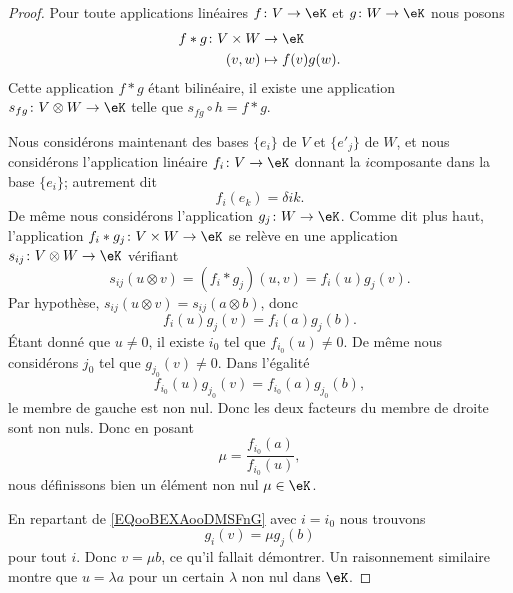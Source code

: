 \begin{proof}
	Pour toute applications linéaires \(f \colon V\to \eK  \) et \(g \colon W\to \eK  \) nous posons
	\begin{equation}
		\begin{aligned}
			f*g\colon V\times W & \to \eK           \\
			(v,w)               & \mapsto f(v)g(w).
		\end{aligned}
	\end{equation}
	Cette application \( f*g\) étant bilinéaire, il existe une application \(s_{fg} \colon V\otimes W\to \eK  \) telle que \( s_{fg}\circ h=f*g\).

	Nous considérons maintenant des bases \( \{ e_i \}\) de \( V\) et \( \{ e'_j \}\) de \( W\), et nous considérons l'application linéaire \(f_i \colon V\to \eK  \) donnant la \( i\)\ieme composante dans la base \( \{ e_i \}\); autrement dit
	\begin{equation}
		f_i(e_k)=\delta{ik}.
	\end{equation}
	De même nous considérons l'application \(g_j \colon W\to \eK  \). Comme dit plus haut, l'application \(f_i*g_j \colon V\times W\to \eK  \) se relève en une application \(s_{ij} \colon V\otimes W\to \eK  \) vérifiant
	\begin{equation}
		s_{ij}(u\otimes v)=(f_i*g_j)(u,v)=f_i(u)g_j(v).
	\end{equation}
	Par hypothèse, \( s_{ij}(u\otimes v)=s_{ij}(a\otimes b)\), donc
	\begin{equation}		\label{EQooBEXAooDMSFnG}
		f_i(u)g_j(v)=f_i(a)g_j(b).
	\end{equation}
	Étant donné que \( u\neq 0\), il existe \( i_0\) tel que \( f_{i_0}(u)\neq 0\). De même nous considérons \( j_0\) tel que \( g_{j_0}(v)\neq 0\). Dans l'égalité
	\begin{equation}
		f_{i_0}(u)g_{j_0}(v)=f_{i_0}(a)g_{j_0}(b),
	\end{equation}
	le membre de gauche est non nul. Donc les deux facteurs du membre de droite sont non nuls. Donc en posant
	\begin{equation}
		\mu=\frac{ f_{i_0}(a) }{ f_{i_0}(u) },
	\end{equation}
	nous définissons bien un élément non nul \( \mu\in \eK\).

	En repartant de \eqref{EQooBEXAooDMSFnG} avec \( i=i_0\) nous trouvons
	\begin{equation}
		g_i(v)=\mu g_j(b)
	\end{equation}
	pour tout \( i\). Donc \( v=\mu b\), ce qu'il fallait démontrer. Un raisonnement similaire montre que \( u=\lambda a\) pour un certain \( \lambda\) non nul dans  \(\eK\).
\end{proof}

